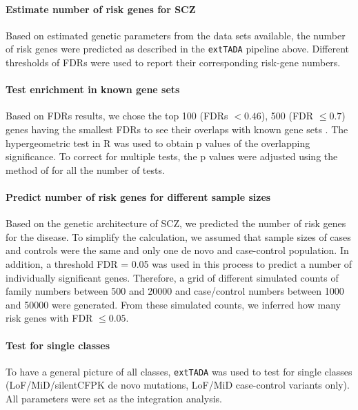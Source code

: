 \documentclass[]{article}
\begin{document}
\paragraph{Estimate number of risk genes for SCZ}

Based on estimated genetic parameters from the data sets available, the number of risk genes were
predicted as described in the \texttt{extTADA} pipeline above. Different thresholds of FDRs were used to
report their corresponding risk-gene numbers.

\paragraph{Test enrichment in known gene sets}

Based on FDRs results, we chose the top 100 (FDRs $< 0.46$), 500 (FDR
$\le 0.7$) genes having the smallest FDRs to
see their overlaps with known gene sets . The hypergeometric test in R
\citep{kachitvichyanukul1985computer} was used to obtain p values of
the overlapping significance. To correct for multiple tests, the p
values were adjusted using the method of
\cite{benjamini1995controlling} for all the number of tests.



\paragraph{Predict number of risk genes for different sample sizes}

Based on the genetic architecture of SCZ, we predicted the number of
risk genes for the disease. To simplify the calculation, we assumed
that sample sizes of cases and controls were the same and only one de
novo and case-control population. In addition, a
 threshold FDR = 0.05 was used in this process to predict a number of
 individually significant genes. Therefore, a
grid of different simulated counts of family numbers between 500 and
20000 and case/control numbers between 1000 and 50000 were
generated. From these simulated counts, we inferred how many risk
genes with FDR $\le 0.05$.

\paragraph{Test for single classes}

To have a general picture of all classes, \texttt{extTADA} was used to test for single classes (LoF/MiD/silentCFPK de
novo mutations, LoF/MiD case-control variants only). All parameters were set as the
integration analysis.
\end{document}
